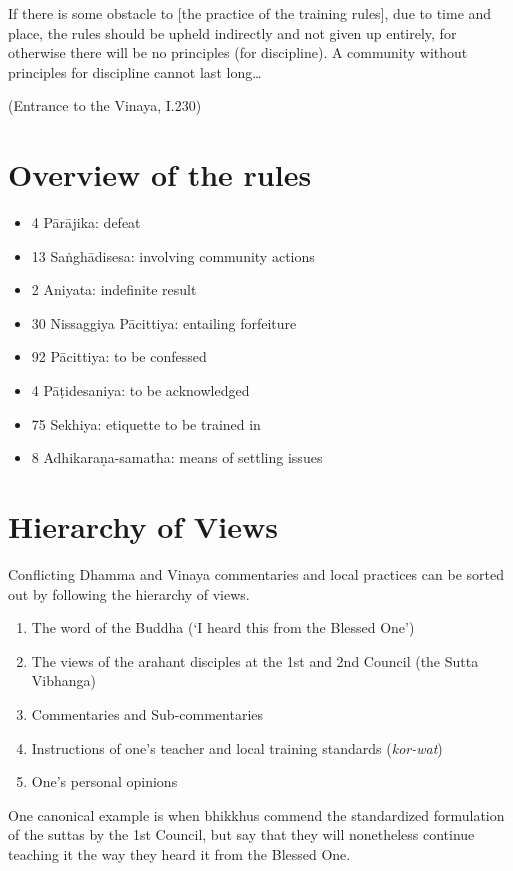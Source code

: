 If there is some obstacle to {[}the practice of the training rules{]},
due to time and place, the rules should be upheld indirectly and not
given up entirely, for otherwise there will be no principles (for
discipline). A community without principles for discipline cannot last
long\ldots{}

(Entrance to the Vinaya, I.230)

\section{Overview of the rules}

\begin{itemize}
\tightlist
\item
  4 Pārājika: defeat
\item
  13 Saṅghādisesa: involving community actions
\item
  2 Aniyata: indefinite result
\item
  30 Nissaggiya Pācittiya: entailing forfeiture
\item
  92 Pācittiya: to be confessed
\item
  4 Pāṭidesaniya: to be acknowledged
\item
  75 Sekhiya: etiquette to be trained in
\item
  8 Adhikaraṇa-samatha: means of settling issues
\end{itemize}

\section{Hierarchy of Views}

Conflicting Dhamma and Vinaya commentaries and local practices can be
sorted out by following the hierarchy of views.

\begin{enumerate}
\def\labelenumi{\arabic{enumi}.}
\tightlist
\item
  The word of the Buddha (`I heard this from the Blessed One')
\item
  The views of the arahant disciples at the 1st and 2nd Council (the
  Sutta Vibhanga)
\item
  Commentaries and Sub-commentaries
\item
  Instructions of one's teacher and local training standards
  (\emph{kor-wat})
\item
  One's personal opinions
\end{enumerate}

One canonical example is when bhikkhus commend the standardized
formulation of the suttas by the 1st Council, but say that they will
nonetheless continue teaching it the way they heard it from the Blessed
One.


